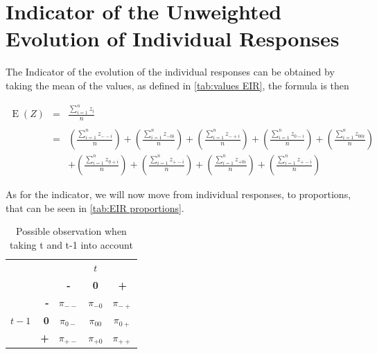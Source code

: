 \documentclass[12pt,a4paper,oneside]{book}
\DeclareMathOperator{\E}{E}
\begin{document}
\section{Indicator of the Unweighted Evolution of Individual Responses}


The Indicator of the evolution of the individual responses can be obtained by taking the mean of the values, as defined in \autoref{tab:values EIR}, the formula is then

\begin{eqnarray}
    \E(Z) &=&  \frac{ \sum_{i=1}^n z_i}{n} \\ \nonumber \\
        &=& \left( \frac{ \sum_{i=1}^n z_{--i}}{n} \right)
     + \left( \frac{\sum_{i=1}^n z_{-0i} }{n} \right)
    + \left( \frac{\sum_{i=1}^n z_{-+i}}{n} \right)
    + \left( \frac{\sum_{i=1}^n z_{0-i} }{n} \right)
    + \left( \frac{\sum_{i=1}^n z_{00i} }{n} \right) \nonumber  \\
    &&  + \left( \frac{\sum_{i=1}^n z_{0+i}}{n} \right)
    + \left( \frac{\sum_{i=1}^n z_{+-i} }{n} \right)
    + \left( \frac{\sum_{i=1}^n z_{+0i} }{n} \right)
    + \left( \frac{\sum_{i=1}^n z_{+-i}}{n} \right)
\end{eqnarray}

As for the indicator, we will now move from individual responses, to proportions, that can be seen in \autoref{tab:EIR proportions}.

\begin{table}[H]
    \centering
    \begin{tabular}{r | r | c c c | }
    \multicolumn{1}{r}{} & \multicolumn{1}{r}{} &	\multicolumn{3}{c}{$t$} \\ \cline{3-5}
    \multicolumn{1}{r}{} & 		& \textbf{-} & \textbf{0} & \textbf{+} \\ \cline{2-5}
    		&    \textbf{-} & $\pi_{--}$	& $\pi_{-0}$	& $\pi_{-+}$ \\ 
    $t-1$ & \textbf{0} & $\pi_{0-}$	& $\pi_{00}$	& $\pi_{0+}$	\\
    		&    \textbf{+} & $\pi_{+-}$	& $\pi_{+0}$	& $\pi_{++}$ \\ \cline{2-5}
    \end{tabular}    
    \caption{Possible observation when taking t and t-1 into account}
    \label{tab:EIR proportions}
\end{table}
\end{document}
